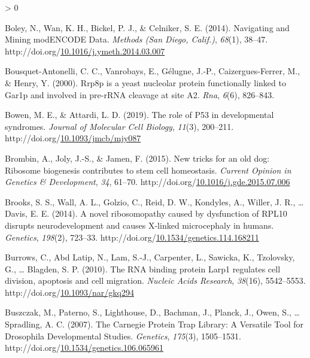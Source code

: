 \documentclass[12pt,oneside]{reedthesis}
\newlength{\cslhangindent}
\newenvironment{CSLReferences}[2] %
 {%
  \setlength{\parindent}{0pt}
  \ifodd #1 \everypar{\setlength{\hangindent}{\cslhangindent}}\ignorespaces\fi
  \ifnum #2 > 0
  \setlength{\parskip}{#2\baselineskip}
  \fi
 }%
 {}
\begin{document}
\begin{CSLReferences}{1}{0}
\leavevmode\hypertarget{ref-boleyNavigatingMiningModENCODE2014}{}%
Boley, N., Wan, K. H., Bickel, P. J., \& Celniker, S. E. (2014). Navigating and {Mining modENCODE Data}. \emph{Methods (San Diego, Calif.)}, \emph{68}(1), 38--47. http://doi.org/\href{https://doi.org/10.1016/j.ymeth.2014.03.007}{10.1016/j.ymeth.2014.03.007}

\leavevmode\hypertarget{ref-Bousquet-Antonelli2000a}{}%
Bousquet-Antonelli, C. C., Vanrobays, E., Gélugne, J.-P., Caizergues-Ferrer, M., \& Henry, Y. (2000). Rrp8p is a yeast nucleolar protein functionally linked to {Gar1p} and involved in pre-{rRNA} cleavage at site {A2}. \emph{Rna}, \emph{6}(6), 826--843.

\leavevmode\hypertarget{ref-bowenRoleP53Developmental2019}{}%
Bowen, M. E., \& Attardi, L. D. (2019). The role of P53 in developmental syndromes. \emph{Journal of Molecular Cell Biology}, \emph{11}(3), 200--211. http://doi.org/\href{https://doi.org/10.1093/jmcb/mjy087}{10.1093/jmcb/mjy087}

\leavevmode\hypertarget{ref-brombinNewTricksOld2015}{}%
Brombin, A., Joly, J.-S., \& Jamen, F. (2015). New tricks for an old dog: Ribosome biogenesis contributes to stem cell homeostasis. \emph{Current Opinion in Genetics \& Development}, \emph{34}, 61--70. http://doi.org/\href{https://doi.org/10.1016/j.gde.2015.07.006}{10.1016/j.gde.2015.07.006}

\leavevmode\hypertarget{ref-Brooks2014b}{}%
Brooks, S. S., Wall, A. L., Golzio, C., Reid, D. W., Kondyles, A., Willer, J. R., \ldots{} Davis, E. E. (2014). A novel ribosomopathy caused by dysfunction of {RPL10} disrupts neurodevelopment and causes {X-linked} microcephaly in humans. \emph{Genetics}, \emph{198}(2), 723--33. http://doi.org/\href{https://doi.org/10.1534/genetics.114.168211}{10.1534/genetics.114.168211}

\leavevmode\hypertarget{ref-burrowsRNABindingProtein2010}{}%
Burrows, C., Abd Latip, N., Lam, S.-J., Carpenter, L., Sawicka, K., Tzolovsky, G., \ldots{} Blagden, S. P. (2010). The {RNA} binding protein {Larp1} regulates cell division, apoptosis and cell migration. \emph{Nucleic Acids Research}, \emph{38}(16), 5542--5553. http://doi.org/\href{https://doi.org/10.1093/nar/gkq294}{10.1093/nar/gkq294}

\leavevmode\hypertarget{ref-buszczakCarnegieProteinTrap2007}{}%
Buszczak, M., Paterno, S., Lighthouse, D., Bachman, J., Planck, J., Owen, S., \ldots{} Spradling, A. C. (2007). The {Carnegie Protein Trap Library}: {A Versatile Tool} for {Drosophila Developmental Studies}. \emph{Genetics}, \emph{175}(3), 1505--1531. http://doi.org/\href{https://doi.org/10.1534/genetics.106.065961}{10.1534/genetics.106.065961}


\end{CSLReferences}
\end{document}
